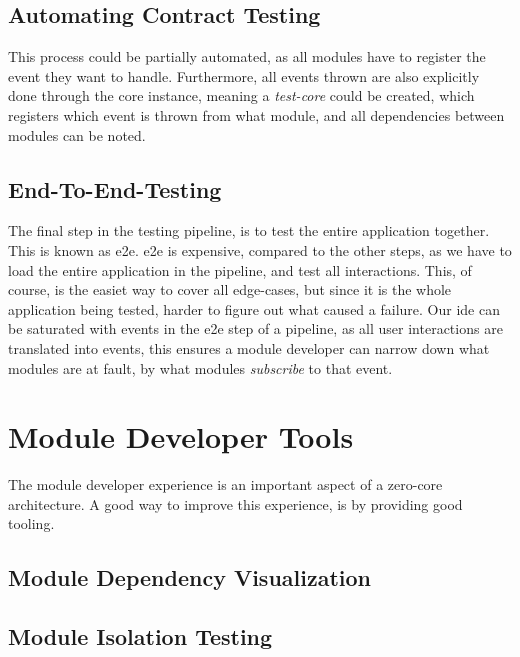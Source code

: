 \subsection{Automating Contract Testing}

This process could be partially automated, as all modules have to register the
event they want to handle. Furthermore, all events thrown are also explicitly
done through the core instance, meaning a \textit{test-core} could be created,
which registers which event is thrown from what module, and all dependencies
between modules can be noted.

\subsection{End-To-End-Testing}

The final step in the testing pipeline, is to test the entire application
together. This is known as \gls{e2e}. \gls{e2e} is expensive, compared to the
other steps, as we have to load the entire application in the pipeline, and test
all interactions. This, of course, is the easiet way to cover all edge-cases, but
since it is the whole application being tested, harder to figure out what caused
a failure. Our \gls{ide} can be saturated with events in the \gls{e2e} step of a
pipeline, as all user interactions are translated into events, this ensures a
module developer can narrow down what modules are at fault, by what modules
\textit{subscribe} to that event.

\section{Module Developer Tools}

The module developer experience is an important aspect of a zero-core
architecture. A good way to improve this experience, is by providing good
tooling.

\subsection{Module Dependency Visualization}


\subsection{Module Isolation Testing}


